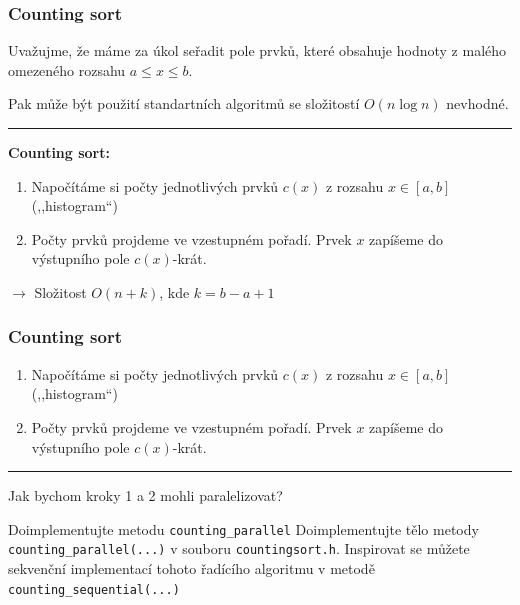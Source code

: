 \documentclass[usenames,dvipsnames,9pt]{beamer}
\begin{document}
{
\begin{frame}
	\frametitle{Counting sort}
	Uvažujme, že máme za úkol seřadit pole prvků, které obsahuje hodnoty z malého omezeného rozsahu $a \leq x \leq b$.

	Pak může být použití standartních algoritmů se složitostí $O(n \log n)$ nevhodné.

	\vspace{1em}\hrule\vspace{1em}

	\textbf{Counting sort:}
	\begin{enumerate}
		\item Napočítáme si počty jednotlivých prvků $c(x)$ z rozsahu $x\in[a,b]$ (,,histogram``)
		\item Počty prvků projdeme ve vzestupném pořadí. Prvek $x$ zapíšeme do výstupního pole $c(x)$-krát.
	\end{enumerate}

	\vspace{1em}

	\hfill $\rightarrow$ Složitost $O(n + k)$, kde $k = b-a+1$
\end{frame}
\begin{frame}
	\frametitle{Counting sort}
	\begin{enumerate}
		\item Napočítáme si počty jednotlivých prvků $c(x)$ z rozsahu $x\in[a,b]$ (,,histogram``)
		\item Počty prvků projdeme ve vzestupném pořadí. Prvek $x$ zapíšeme do výstupního pole $c(x)$-krát.
	\end{enumerate}

	\vspace{1em}\hrule\vspace{1em}

	\begin{center}
		\Large Jak bychom kroky 1 a 2 mohli paralelizovat?
	\end{center}

	\pause

	\begin{block}{Doimplementujte metodu \texttt{counting\_parallel}}
	    Doimplementujte tělo metody \texttt{counting\_parallel(...)} v souboru \texttt{countingsort.h}.
	    Inspirovat se můžete sekvenční implementací tohoto řadícího algoritmu v metodě \texttt{counting\_sequential(...)}
    \end{block}
\end{frame}

}
\end{document}
